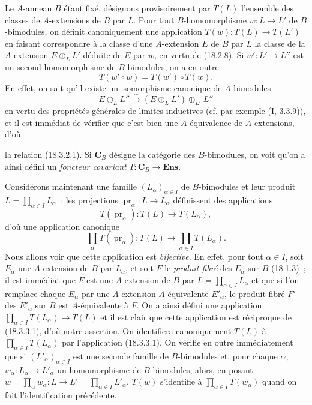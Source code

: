 \begin{env}[18.3.2]
\label{0.18.3.2-fr}
Le $A$-anneau $B$ étant fixé, désignons provisoirement par $T(L)$ l'ensemble
des classes de $A$-extensions de $B$ par $L$. Pour tout $B$-homomorphisme
$w:L\to L'$ de $B$-bimodules, on définit canoniquement une application
$T(w):T(L)\to T(L')$ en faisant correspondre à la classe d'une $A$-extension
$E$ de $B$ par $L$ la classe de la $A$-extension $E\oplus_LL'$ déduite de $E$
par $w$, en vertu de (18.2.8). Si $w':L'\to L''$ est un second homomorphisme
de $B$-bimodules, on a en outre
\begin{equation}
\label{0.18.3.2.1-fr}
\tag{18.3.2.1}
  T(w'\circ w)=T(w')\circ T(w).
\end{equation}
En effet, on sait qu'il existe un isomorphisme canonique de $A$-bimodules
\[
  E\oplus_LL''\xrightarrow{\sim}(E\oplus_LL')\oplus_{L'}L''
\]
en vertu des propriétés générales de limites inductives (cf. par exemple
($\mathrm{I}$, 3.3.9)), et il est immédiat de vérifier que c'est bien une
$A$-équivalence de $A$-extensions, d'où


la relation (18.3.2.1). Si $\mathbf C_B$ désigne la catégorie des
$B$-bimodules, on voit qu'on a ainsi défini un \emph{foncteur covariant}
$T:\mathbf C_B\to\mathbf{Ens}$.
\end{env}

\begin{env}[18.3.3]
\label{0.18.3.3-fr}
Considérons maintenant une famille $(L_\alpha)_{\alpha\in I}$ de
$B$-bimodules et leur produit $L=\prod_{\alpha\in I}L_\alpha$~; les
projections $\operatorname{pr}_\alpha:L\to L_\alpha$ définissent des
applications
\[
  T(\operatorname{pr}_\alpha):T(L)\to T(L_\alpha),
\]
d'où une application canonique
\begin{equation}
\label{0.18.3.3.1-fr}
\tag{18.3.3.1}
  \prod_\alpha T(\operatorname{pr}_\alpha):T(L)
  \longrightarrow\prod_{\alpha\in I}T(L_\alpha).
\end{equation}
Nous allons voir que cette application est \emph{bijective}. En effet, pour
tout $\alpha\in I$, soit $E_\alpha$ une $A$-extension de $B$ par $L_\alpha$,
et soit $F$ le \emph{produit fibré} des $E_\alpha$ sur $B$ (18.1.3)~; il est
immédiat que $F$ est une $A$-extension de $B$ par
$L=\prod_{\alpha\in I}L_\alpha$ et que si l'on remplace chaque $E_\alpha$ par
une $A$-extension $A$-équivalente $E'_\alpha$, le produit fibré $F'$ des
$E'_\alpha$ sur $B$ est $A$-équivalente à $F$. On a ainsi défini une
application $\prod_{\alpha\in I}T(L_\alpha)\to T(L)$ et il est clair que cette
application est réciproque de (18.3.3.1), d'où notre assertion. On identifiera
canoniquement $T(L)$ à $\prod_{\alpha\in I}T(L_\alpha)$ par l'application
(18.3.3.1). On vérifie en outre immédiatement que si
$(L'_\alpha)_{\alpha\in I}$ est une seconde famille de $B$-bimodules et, pour
chaque $\alpha$, $w_\alpha:L_\alpha\to L'_\alpha$ un homomorphisme de
$B$-bimodules, alors, en posant
$w=\prod_\alpha w_\alpha:L\to L'=\prod_{\alpha\in I}L'_\alpha$, $T(w)$
s'identifie à $\prod_{\alpha\in I}T(w_\alpha)$ quand on fait l'identification
précédente.
\end{env}

